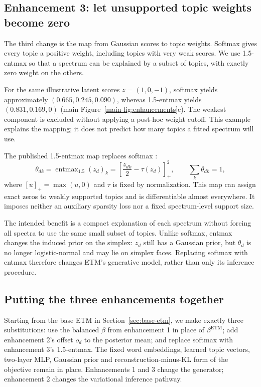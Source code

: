 \documentclass[10pt,a4paper]{article}
\newcommand{\entmax}{\operatorname{entmax}_{1.5}}
\begin{document}
\subsection{Enhancement 3: let unsupported topic weights become zero}
\label{sec:sparsity}

The third change is the map from Gaussian scores to topic weights. Softmax
gives every topic a positive weight, including topics with very weak scores.
We use 1.5-entmax so that a spectrum can be explained by a subset of topics,
with exactly zero weight on the others.

For the same illustrative latent scores $z=(1,0,-1)$, softmax yields
approximately $(0.665,0.245,0.090)$, whereas 1.5-entmax yields
$(0.831,0.169,0)$ (main Figure~\ref{main-fig:enhancements}c). The weakest component
is excluded without applying a post-hoc weight cutoff. This example explains
the mapping; it does not predict how many topics a fitted spectrum will use.

The published 1.5-entmax map replaces softmax \cite{peters2019}:
\begin{equation}
 \theta_{dk}=\entmax(z_d)_k
 =\left[\frac{z_{dk}}2-\tau(z_d)\right]_+^2,\qquad
 \sum_k\theta_{dk}=1,
 \label{eq:entmax}
\end{equation}
where $[u]_+=\max(u,0)$ and $\tau$ is fixed by normalization.
This map can assign exact zeros to weakly supported topics and is
differentiable almost everywhere. It imposes neither an auxiliary sparsity
loss nor a fixed spectrum-level support size.

The intended benefit is a compact explanation of each spectrum without
forcing all spectra to use the same small subset of topics. Unlike softmax,
entmax changes the induced prior on the simplex: $z_d$ still has a Gaussian
prior, but $\theta_d$ is no longer logistic-normal and may lie on simplex faces.
Replacing softmax with entmax therefore changes ETM's generative model,
rather than only its inference procedure.

\subsection{Putting the three enhancements together}
\label{sec:objective}
\label{sec:complete-model}

Starting from the base ETM in Section~\ref{sec:base-etm}, we make exactly
three substitutions: use the balanced $\beta$ from enhancement 1 in place
of $\beta^{\mathrm{ETM}}$; add enhancement 2's offset $o_d$ to the posterior
mean; and replace softmax with enhancement 3's 1.5-entmax. The fixed word
embeddings, learned topic vectors, two-layer MLP, Gaussian prior and
reconstruction-minus-KL form of the objective remain in place.
Enhancements 1 and 3 change the generator; enhancement 2 changes the
variational inference pathway.
\end{document}
